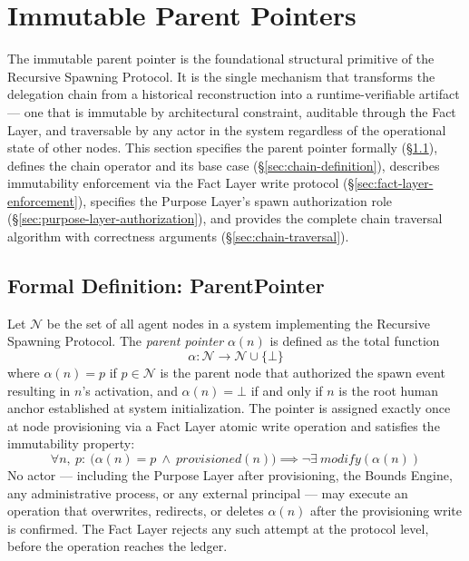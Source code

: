\section{Immutable Parent Pointers}
\label{sec:immutable-parent-pointers}

The immutable parent pointer is the foundational structural primitive of the Recursive Spawning Protocol. It is the single mechanism that transforms the delegation chain from a historical reconstruction into a runtime-verifiable artifact — one that is immutable by architectural constraint, auditable through the Fact Layer, and traversable by any actor in the system regardless of the operational state of other nodes. This section specifies the parent pointer formally (\S\ref{sec:parent-pointer-formal}), defines the chain operator and its base case (\S\ref{sec:chain-definition}), describes immutability enforcement via the Fact Layer write protocol (\S\ref{sec:fact-layer-enforcement}), specifies the Purpose Layer's spawn authorization role (\S\ref{sec:purpose-layer-authorization}), and provides the complete chain traversal algorithm with correctness arguments (\S\ref{sec:chain-traversal}).

\subsection{Formal Definition: ParentPointer}
\label{sec:parent-pointer-formal}

\begin{dfn}
\label{dfn:parent-pointer}
Let $\mathcal{N}$ be the set of all agent nodes in a system implementing the Recursive Spawning Protocol. The \emph{parent pointer} $\alpha(n)$ is defined as the total function
\begin{equation}
\alpha : \mathcal{N} \longrightarrow \mathcal{N} \cup \{\bot\}
\label{eq:parent-pointer-function}
\end{equation}
where $\alpha(n) = p$ if $p \in \mathcal{N}$ is the parent node that authorized the spawn event resulting in $n$'s activation, and $\alpha(n) = \bot$ if and only if $n$ is the root human anchor established at system initialization. The pointer is assigned exactly once at node provisioning via a Fact Layer atomic write operation and satisfies the immutability property:
\begin{equation}
\forall n,\ p:\ \bigl(\alpha(n) = p \ \land \ \textit{provisioned}(n)\bigr) \implies \neg\exists\ \textit{modify}(\alpha(n))
\label{eq:parent-pointer-immutable}
\end{equation}
No actor — including the Purpose Layer after provisioning, the Bounds Engine, any administrative process, or any external principal — may execute an operation that overwrites, redirects, or deletes $\alpha(n)$ after the provisioning write is confirmed. The Fact Layer rejects any such attempt at the protocol level, before the operation reaches the ledger.
\end{dfn}

